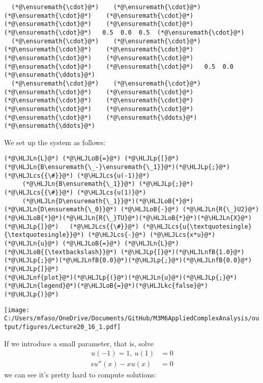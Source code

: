 \documentclass[12pt,landscape]{article}
\newcommand{\HLJLkc}[1]{\textcolor[RGB]{59,151,46}{\textit{#1}}}
\newcommand{\HLJLn}[1]{#1}
\newcommand{\HLJLnf}[1]{\textcolor[RGB]{66,102,213}{#1}}
\newcommand{\HLJLnfB}[1]{\textcolor[RGB]{59,151,46}{#1}}
\newcommand{\HLJLoB}[1]{\textcolor[RGB]{102,102,102}{\textbf{#1}}}
\newcommand{\HLJLp}[1]{#1}
\newcommand{\HLJLcs}[1]{\textcolor[RGB]{153,153,119}{\textit{#1}}}
\def\cent#1{\begin{center}#1\end{center} }
\begin{document}
{\begin{lstlisting}
  (*@\ensuremath{\cdot}@*)    (*@\ensuremath{\cdot}@*)    (*@\ensuremath{\cdot}@*)    (*@\ensuremath{\cdot}@*)    (*@\ensuremath{\cdot}@*)    (*@\ensuremath{\cdot}@*)    (*@\ensuremath{\cdot}@*)   0.5  0.0  0.5  (*@\ensuremath{\cdot}@*)
  (*@\ensuremath{\cdot}@*)    (*@\ensuremath{\cdot}@*)    (*@\ensuremath{\cdot}@*)    (*@\ensuremath{\cdot}@*)    (*@\ensuremath{\cdot}@*)    (*@\ensuremath{\cdot}@*)    (*@\ensuremath{\cdot}@*)    (*@\ensuremath{\cdot}@*)   0.5  0.0  (*@\ensuremath{\ddots}@*)
  (*@\ensuremath{\cdot}@*)    (*@\ensuremath{\cdot}@*)    (*@\ensuremath{\cdot}@*)    (*@\ensuremath{\cdot}@*)    (*@\ensuremath{\cdot}@*)    (*@\ensuremath{\cdot}@*)    (*@\ensuremath{\cdot}@*)    (*@\ensuremath{\cdot}@*)    (*@\ensuremath{\cdot}@*)    (*@\ensuremath{\ddots}@*)   (*@\ensuremath{\ddots}@*)
\end{lstlisting}


We set up the system as follows:


\begin{lstlisting}
(*@\HLJLn{L}@*) (*@\HLJLoB{=}@*) (*@\HLJLp{[}@*)(*@\HLJLn{B\ensuremath{\_-}\ensuremath{\_1}}@*)(*@\HLJLp{;}@*)   (*@\HLJLcs{{\#}}@*) (*@\HLJLcs{u(-1)}@*)
     (*@\HLJLn{B\ensuremath{\_1}}@*) (*@\HLJLp{;}@*)   (*@\HLJLcs{{\#}}@*) (*@\HLJLcs{u(1)}@*)
     (*@\HLJLn{D\ensuremath{\_1}}@*)(*@\HLJLoB{*}@*)(*@\HLJLn{D\ensuremath{\_0}}@*) (*@\HLJLoB{-}@*) (*@\HLJLn{R{\_}U2}@*)(*@\HLJLoB{*}@*)(*@\HLJLn{R{\_}TU}@*)(*@\HLJLoB{*}@*)(*@\HLJLn{X}@*)(*@\HLJLp{]}@*)   (*@\HLJLcs{{\#}}@*) (*@\HLJLcs{u{\textquotesingle}{\textquotesingle}}@*) (*@\HLJLcs{-}@*) (*@\HLJLcs{x*u}@*)
(*@\HLJLn{u}@*) (*@\HLJLoB{=}@*) (*@\HLJLn{L}@*) (*@\HLJLoB{{\textbackslash}}@*) (*@\HLJLp{[}@*)(*@\HLJLnfB{1.0}@*)(*@\HLJLp{;}@*)(*@\HLJLnfB{0.0}@*)(*@\HLJLp{;}@*)(*@\HLJLnfB{0.0}@*)(*@\HLJLp{]}@*)
(*@\HLJLnf{plot}@*)(*@\HLJLp{(}@*)(*@\HLJLn{u}@*)(*@\HLJLp{;}@*) (*@\HLJLn{legend}@*)(*@\HLJLoB{=}@*)(*@\HLJLkc{false}@*)(*@\HLJLp{)}@*)
\end{lstlisting}

\cent{\texttt{[image: C:/Users/mfaso/OneDrive/Documents/GitHub/M3M6AppliedComplexAnalysis/output/figures/Lecture20\_16\_1.pdf]}}

If we introduce a small parameter, that is, solve
\begin{align*}
u(-1) = 1, \: 
u(1) &= 0\\
\epsilon u''(x) - xu(x) &= 0
\end{align*}
we can see it's pretty hard to compute solutions:


}
\end{document}
